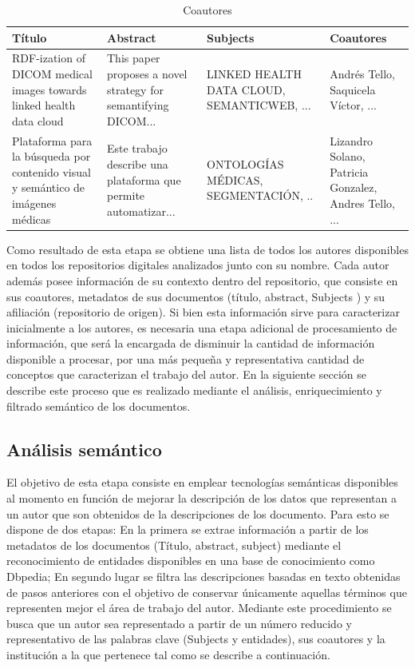 \documentclass[conference]{IEEEtran}
\begin{document}
\begin{table}[]
\centering
\caption{Coautores}
\label{tb:coautores}
\begin{tabular}{@{}p{}p{}p{}p{}@{}}
\toprule
Título                                                                           & Abstract                                                        & Subjects                                   & Coautores                                             \\ \midrule
RDF-ization of DICOM medical images towards linked health data cloud             & This paper proposes a novel strategy for semantifying DICOM...  & LINKED HEALTH DATA CLOUD, SEMANTICWEB, ... & Andrés Tello, Saquicela Víctor, ...                   \\
Plataforma para la búsqueda por contenido visual y semántico de imágenes médicas & Este trabajo describe una plataforma que permite automatizar... & ONTOLOGÍAS MÉDICAS, SEGMENTACIÓN, ..       & Lizandro Solano, Patricia Gonzalez, Andres Tello, ... \\ \bottomrule
\end{tabular}
\end{table}

Como resultado de esta etapa se obtiene una lista de todos los autores disponibles en todos los repositorios digitales analizados junto con su nombre. Cada autor además posee información de su contexto dentro del repositorio, que consiste en sus coautores, metadatos de sus documentos (título, abstract, Subjects ) y su afiliación (repositorio de origen). Si bien esta información sirve para caracterizar inicialmente a los autores, es necesaria una etapa adicional de procesamiento de información, que será la encargada de disminuir la cantidad de información disponible a procesar,  por una más  pequeña y representativa cantidad de conceptos que caracterizan el trabajo del autor. En la siguiente sección se describe este proceso que es realizado mediante  el análisis, enriquecimiento y filtrado semántico de los documentos.

\subsection{Análisis semántico}

El objetivo de esta etapa consiste en emplear tecnologías semánticas disponibles al momento en función de mejorar la descripción de los datos que representan a un  autor que son obtenidos de la descripciones de los documento.  Para esto se dispone de dos etapas: En la primera se extrae información a partir de los metadatos de los documentos (Título, abstract, subject) mediante el reconocimiento de entidades disponibles en una base de conocimiento como Dbpedia; En segundo lugar se filtra las descripciones basadas en texto obtenidas de pasos anteriores con el objetivo de conservar únicamente aquellas términos que representen mejor el área de trabajo del autor.  Mediante este procedimiento se busca que un autor sea representado  a partir de un número reducido y representativo   de las palabras clave (Subjects y entidades), sus coautores y la institución a la que pertenece tal como se describe a continuación. 
\end{document}
